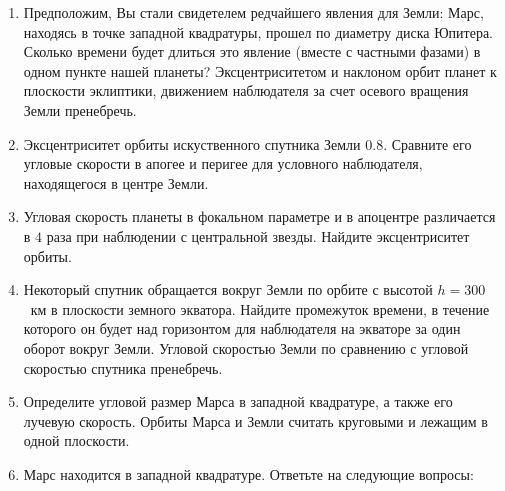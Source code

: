 \documentclass[12pt]{article}
\begin{document}
\begin{enumerate}
\begin{figure}[ht]
    \end{figure}
    \item Предположим, Вы стали свидетелем редчайшего явления для Земли: Марс, находясь в точке западной квадратуры, прошел по диаметру диска Юпитера. Сколько времени будет длиться это явление (вместе с частными фазами) в одном пункте нашей планеты? Эксцентриситетом и наклоном орбит планет к плоскости эклиптики, движением наблюдателя за счет осевого вращения Земли пренебречь.
    \item Эксцентриситет орбиты искуственного спутника Земли $0.8$. Сравните его угловые скорости в апогее и перигее для условного наблюдателя, находящегося в центре Земли.
    \item Угловая скорость планеты в фокальном параметре и в апоцентре различается в $4$ раза при наблюдении с центральной звезды. Найдите эксцентриситет орбиты.
    \item Некоторый спутник обращается вокруг Земли по орбите с высотой $h = 300$~км в плоскости земного экватора. Найдите промежуток времени, в течение которого он будет над горизонтом для наблюдателя на экваторе за один оборот вокруг Земли. Угловой скоростью Земли по сравнению с угловой скоростью спутника пренебречь.
    \item Определите угловой размер Марса в западной квадратуре, а также его лучевую скорость. Орбиты Марса и Земли считать круговыми и лежащим в одной плоскости. 
    \item Марс находится в западной квадратуре. Ответьте на следующие вопросы: 
    \begin{enumerate}

\end{enumerate}
\end{enumerate}
\end{document}
